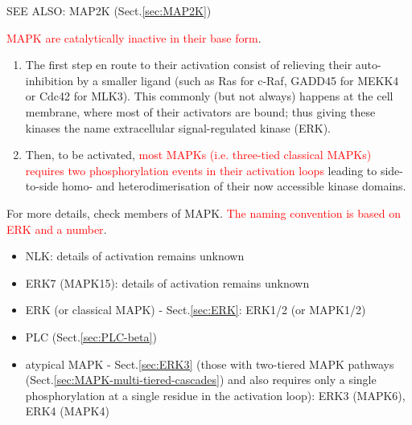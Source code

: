 SEE ALSO: MAP2K (Sect.\ref{sec:MAP2K})

\textcolor{red}{MAPK are catalytically inactive in their base form}.
\begin{enumerate}
  
  \item The first step en route to their activation consist of relieving their
  auto-inhibition by a smaller ligand (such as Ras for c-Raf, GADD45 for MEKK4
  or Cdc42 for MLK3). This commonly (but not always) happens at the cell
  membrane, where most of their activators are bound; thus giving these kinases
  the name extracellular signal-regulated kinase (ERK).

  \item Then, to be activated, \textcolor{red}{most MAPKs (i.e. three-tied
  classical MAPKs) requires two phosphorylation events in their activation
  loops} leading to side-to-side homo- and heterodimerisation of their now
  accessible kinase domains.
\end{enumerate}

For more details, check members of MAPK. \textcolor{red}{The naming convention
is based on ERK and a number}.

\begin{itemize}
  \item NLK: details of activation remains unknown
  
  \item ERK7 (MAPK15): details of activation remains unknown
  
  \item ERK (or classical MAPK) - Sect.\ref{sec:ERK}:
   ERK1/2 (or MAPK1/2)
  \item  PLC (Sect.\ref{sec:PLC-beta})
  
  \item atypical MAPK - Sect.\ref{sec:ERK3} (those with two-tiered MAPK pathways
  (Sect.\ref{sec:MAPK-multi-tiered-cascades}) and also requires only a single
  phosphorylation at a single residue in the activation loop):  ERK3 (MAPK6),
  ERK4 (MAPK4)
  
\end{itemize}


